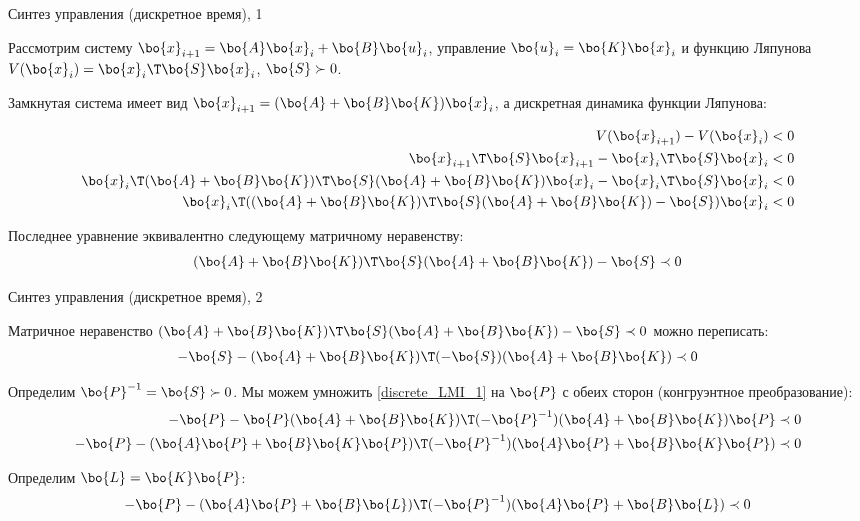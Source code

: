\documentclass{beamer}
\begin{document}
\begin{frame}{Синтез управления (дискретное время), 1}
	\begin{flushleft}
		
		Рассмотрим систему $\bo{x}_{i+1} = \bo{A}\bo{x}_i + \bo{B}\bo{u}_i$, управление $\bo{u}_i = \bo{K}\bo{x}_i$ и функцию Ляпунова $V(\bo{x}_i) = \bo{x}_i\T \bo{S} \bo{x}_i$, $\bo{S} \succ 0$.
		
		\bigskip
		
		Замкнутая система имеет вид $\bo{x}_{i+1} = (\bo{A} + \bo{B}\bo{K})\bo{x}_i$, а дискретная динамика функции Ляпунова:
		
		\begin{align}
			V(\bo{x}_{i+1}) - V(\bo{x}_i) <0 
			\\
			\bo{x}_{i+1}\T \bo{S} \bo{x}_{i+1} - \bo{x}_i\T \bo{S} \bo{x}_i < 0
			\\
			\bo{x}_i\T(\bo{A} + \bo{B}\bo{K})\T \bo{S} (\bo{A} + \bo{B}\bo{K})\bo{x}_i - \bo{x}_i\T \bo{S} \bo{x}_i < 0
			\\
			\bo{x}_i\T((\bo{A} + \bo{B}\bo{K})\T \bo{S} (\bo{A} + \bo{B}\bo{K}) - \bo{S})\bo{x}_i < 0
		\end{align}
		
		Последнее уравнение эквивалентно следующему матричному неравенству:
		\begin{align}
			(\bo{A} + \bo{B}\bo{K})\T \bo{S} (\bo{A} + \bo{B}\bo{K}) - \bo{S} \prec 0
		\end{align}
		
		
	\end{flushleft}
\end{frame}

\begin{frame}{Синтез управления (дискретное время), 2}
	\begin{flushleft}
		
		Матричное неравенство $(\bo{A} + \bo{B}\bo{K})\T \bo{S} (\bo{A} + \bo{B}\bo{K}) - \bo{S} \prec 0$ можно переписать:
		\begin{align}
			\label{discrete_LMI_1}
			-\bo{S} - (\bo{A} + \bo{B}\bo{K})\T (-\bo{S}) (\bo{A} + \bo{B}\bo{K})  \prec 0
		\end{align}
		
		Определим $\bo{P}^{-1} = \bo{S} \succ 0$. Мы можем умножить \eqref{discrete_LMI_1} на $\bo{P}$ с обеих сторон (конгруэнтное преобразование):
		\begin{align}
			-\bo{P} - \bo{P}(\bo{A} + \bo{B}\bo{K})\T (-\bo{P}^{-1}) (\bo{A} + \bo{B}\bo{K})\bo{P}  \prec 0
			\\
			-\bo{P} - (\bo{A}\bo{P} + \bo{B}\bo{K}\bo{P})\T (-\bo{P}^{-1}) (\bo{A}\bo{P} + \bo{B}\bo{K}\bo{P})  \prec 0
		\end{align}
		
		Определим $\bo{L} = \bo{K}\bo{P}$:
		\begin{align}
			-\bo{P} - (\bo{A}\bo{P} + \bo{B}\bo{L})\T (-\bo{P}^{-1}) (\bo{A}\bo{P} + \bo{B}\bo{L})  \prec 0
		\end{align}
		
	\end{flushleft}
\end{frame}
\end{document}
